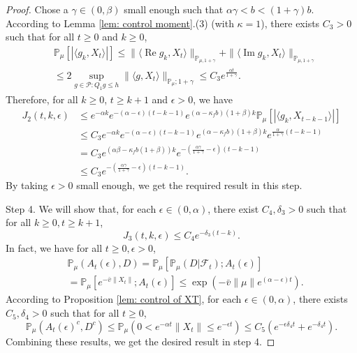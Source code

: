 \documentclass[12pt,a4paper]{amsart}
\theoremstyle{plain}
\theoremstyle{definition}
\numberwithin{equation}{section}
\begin{document}
\begin{proof}
    Chose a $\gamma\in(0,\beta)$ small enough such that $\alpha \gamma < b < (1+\gamma)b$.
    According to Lemma \ref{lem: control moment}.(3) (with $\kappa=1$), there exists $C_3>0$ such that for all $t\geq 0$ and $k\geq 0$,
\begin{align}
    &\mathbb{P}_{\mu}\left[\left|\langle g_k,X_{t}\rangle\right|\right]
    \leq \|\langle \operatorname{Re} g_k, X_{t}\rangle\|_{\mathbb{P}_{\mu,1+\gamma}} + \|\langle \operatorname{Im} g_k, X_{t}\rangle\|_{\mathbb{P}_{\mu,1+\gamma}}
    \\& \leq 2\sup_{g\in \mathcal P: Q_1 g\leq h} \|\langle g, X_t\rangle\|_{\mathbb P_\mu; 1+\gamma} \leq C_3 e^{\frac{\alpha t}{1+\gamma}}.
\end{align}
    Therefore, for all $k\geq 0$, $t\geq k+1$ and $\epsilon> 0$, we have
\begin{align}
\label{eq: right bound for J2}
    J_2(t,k, \epsilon)&
    \leq  e^{-\alpha k}e^{-(\alpha-\epsilon)(t-k-1)}e^{(\alpha-\kappa_f b)(1+\beta)k} \mathbb{P}_{\mu}\left[\left|\langle g_k,X_{t-k-1}\rangle\right|\right]
    \\&\leq C_3 e^{-\alpha k}e^{-(\alpha-\epsilon)(t-k-1)}e^{(\alpha-\kappa_f b)(1+\beta)k} e^{\frac{\alpha}{1+\gamma}(t-k-1)}
    \\&= C_3 e^{(\alpha \beta - \kappa_f b(1+\beta))k}e^{-(\frac{\alpha\gamma}{1+\gamma}-\epsilon)(t-k-1)}
    \\&\leq C_3 e^{-(\frac{\alpha\gamma}{1+\gamma}-\epsilon)(t-k-1)}.
\end{align}
    By taking $\epsilon >0$ small enough, we get the required result in this step.

    Step 4.
    We will show that, for each $\epsilon\in (0,  \alpha)$, there exist $C_4,\delta_3>0$ such that for all $k\geq0, t\geq k+1$,
\begin{equation}\label{ineq: control of J3}
    J_3(t,k,\epsilon)\leq C_4e^{-\delta_3 (t-k)}.
\end{equation}
    In fact, we have  for all $t\geq 0, \epsilon >0$,
\begin{align}
    &\mathbb P_{\mu}(A_{t}(\epsilon), D) = \mathbb P_{\mu}[\mathbb P_{\mu}(D|\mathscr F_t);A_t(\epsilon)]
    \\&= \mathbb P_\mu[e^{-\bar v\|X_t\|};A_t(\epsilon)]
    \leq \exp({-\bar v \|\mu\|e^{(\alpha - \epsilon)t}}).
\end{align}
    According to Proposition \ref{lem: control of XT}, for each $\epsilon \in (0, \alpha)$, there exists  $C_5, \delta_4>0$ such that for all $t\geq 0$,
\begin{equation}
    \mathbb P_\mu(A_t(\epsilon)^c,D^c) \leq   \mathbb P_\mu(0 < e^{-\alpha t}\|X_t\|\leq e^{ - \epsilon t}) \leq C_5 (e^{-\epsilon \delta_4 t}+e^{-\delta_4 t}).
\end{equation}
    Combining these results, we get the desired result in step 4.


\end{proof}
\end{document}
